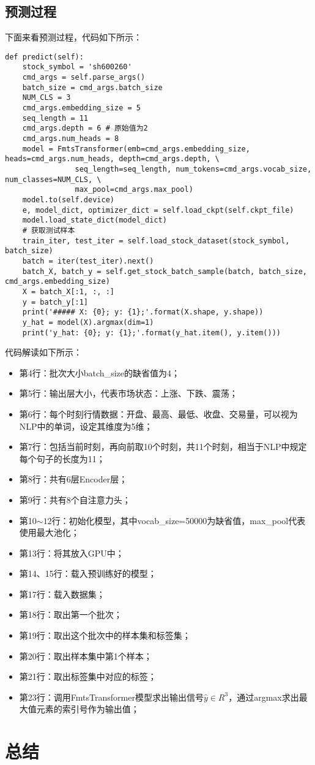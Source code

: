 \subsection{预测过程}
下面来看预测过程，代码如下所示：
\begin{lstlisting}
def predict(self):
    stock_symbol = 'sh600260'
    cmd_args = self.parse_args()
    batch_size = cmd_args.batch_size
    NUM_CLS = 3
    cmd_args.embedding_size = 5
    seq_length = 11
    cmd_args.depth = 6 # 原始值为2
    cmd_args.num_heads = 8
    model = FmtsTransformer(emb=cmd_args.embedding_size, heads=cmd_args.num_heads, depth=cmd_args.depth, \
                seq_length=seq_length, num_tokens=cmd_args.vocab_size, num_classes=NUM_CLS, \
                max_pool=cmd_args.max_pool)
    model.to(self.device)
    e, model_dict, optimizer_dict = self.load_ckpt(self.ckpt_file)
    model.load_state_dict(model_dict)
    # 获取测试样本
    train_iter, test_iter = self.load_stock_dataset(stock_symbol, batch_size)
    batch = iter(test_iter).next()
    batch_X, batch_y = self.get_stock_batch_sample(batch, batch_size, cmd_args.embedding_size)
    X = batch_X[:1, :, :]
    y = batch_y[:1]
    print('##### X: {0}; y: {1};'.format(X.shape, y.shape))
    y_hat = model(X).argmax(dim=1)
    print('y_hat: {0}; y: {1};'.format(y_hat.item(), y.item()))
\end{lstlisting}
代码解读如下所示：
\begin{itemize}
    \item 第4行：批次大小batch\_size的缺省值为4；
    \item 第5行：输出层大小，代表市场状态：上涨、下跌、震荡；
    \item 第6行：每个时刻行情数据：开盘、最高、最低、收盘、交易量，可以视为NLP中的单词，设定其维度为5维；
    \item 第7行：包括当前时刻，再向前取10个时刻，共11个时刻，相当于NLP中规定每个句子的长度为11；
    \item 第8行：共有6层Encoder层；
    \item 第9行：共有8个自注意力头；
    \item 第10$\sim12$行：初始化模型，其中vocab\_size=50000为缺省值，max\_pool代表使用最大池化；
    \item 第13行：将其放入GPU中；
    \item 第14、15行：载入预训练好的模型；
    \item 第17行：载入数据集；
    \item 第18行：取出第一个批次；
    \item 第19行：取出这个批次中的样本集和标签集；
    \item 第20行：取出样本集中第1个样本；
    \item 第21行：取出标签集中对应的标签；
    \item 第23行：调用FmtsTransformer模型求出输出信号$\hat{y} \in R^{3}$，通过argmax求出最大值元素的索引号作为输出值；
\end{itemize}

\section{总结}